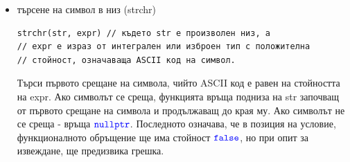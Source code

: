 \documentclass{article}
\begin{document}
\begin{itemize}
обръщение ще има стойност $\cppkw{false}$, но при опит за извеждане, ще предизвиква грешка.
    \item търсене на символ в низ (strchr)
\begin{lstlisting}[style=cpp]
strchr(str, expr) // където str е произволен низ, а
// expr e израз от интегрален или изброен тип с положителна
// стойност, означаваща ASCII код на символ.
\end{lstlisting}
Търси първото срещане на символа, чийто ASCII код е равен на стойността на expr. Ако символът се среща, функцията връща подниза на str
започващ от първото срещане на символа и продължаващ до края му. Ако символът не се среща - връща $\textcolor{blue}{\texttt{nullptr}}$. Последното означава, че
в позиция на условие, функционалното обръщение ще има стойност $\cppkw{false}$, но при опит за извеждане, ще предизвика грешка.
\end{itemize}

\subsection*{\color{bordeaux}{15. Процедурно програмиране – указатели, масиви и рекурсия.}}
\end{document}
